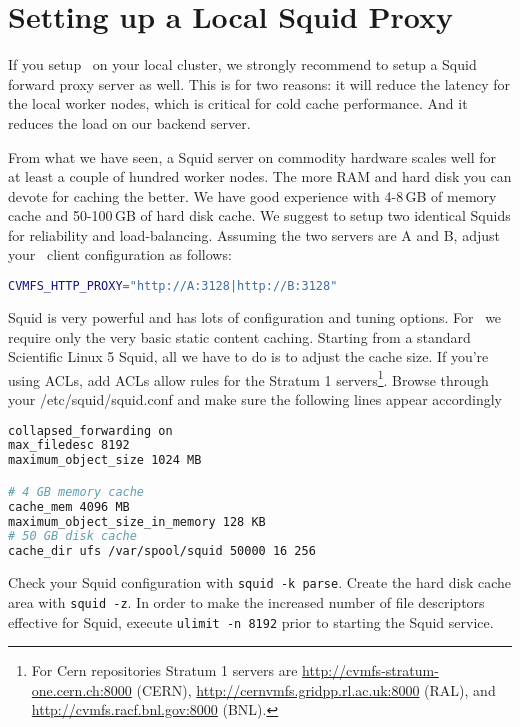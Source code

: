 \chapter{Setting up a Local Squid Proxy}
\label{sct:squid}

If you setup \cvmfs\ on your local cluster, we strongly recommend to setup a Squid forward proxy server as well.
This is for two reasons: it will reduce the latency for the local worker nodes, which is critical for cold cache performance. 
And it reduces the load on our backend server.

From what we have seen, a Squid server on commodity hardware scales well for at least a couple of hundred worker nodes.
The more RAM and hard disk you can devote for caching the better.
We have good experience with 4-8\,GB of memory cache and 50-100\,GB of hard disk cache.
We suggest to setup two identical Squids for reliability and load-balancing.
Assuming the two servers are A and B, adjust your \cvmfs\ client configuration as follows:
\begin{lstlisting}[language=bash]
CVMFS_HTTP_PROXY="http://A:3128|http://B:3128"
\end{lstlisting}

Squid is very powerful and has lots of configuration and tuning options.
For \cvmfs\ we require only the very basic static content caching.
Starting from a standard Scientific Linux 5 Squid, all we have to do is to adjust the cache size.
If you're using ACLs, add ACLs allow rules for the Stratum 1 servers\footnote{For Cern repositories Stratum 1 servers are \url{http://cvmfs-stratum-one.cern.ch:8000} (CERN), \url{http://cernvmfs.gridpp.rl.ac.uk:8000} (RAL), and \url{http://cvmfs.racf.bnl.gov:8000} (BNL).}.
Browse through your /etc/squid/squid.conf and make sure the following lines appear accordingly
\begin{lstlisting}[language=bash]
collapsed_forwarding on
max_filedesc 8192
maximum_object_size 1024 MB

# 4 GB memory cache
cache_mem 4096 MB
maximum_object_size_in_memory 128 KB
# 50 GB disk cache
cache_dir ufs /var/spool/squid 50000 16 256
\end{lstlisting}

Check your Squid configuration with \texttt{squid -k parse}.
Create the hard disk cache area with \texttt{squid -z}.
In order to make the increased number of file descriptors effective for Squid, execute \texttt{ulimit -n 8192} prior to starting the Squid service.

